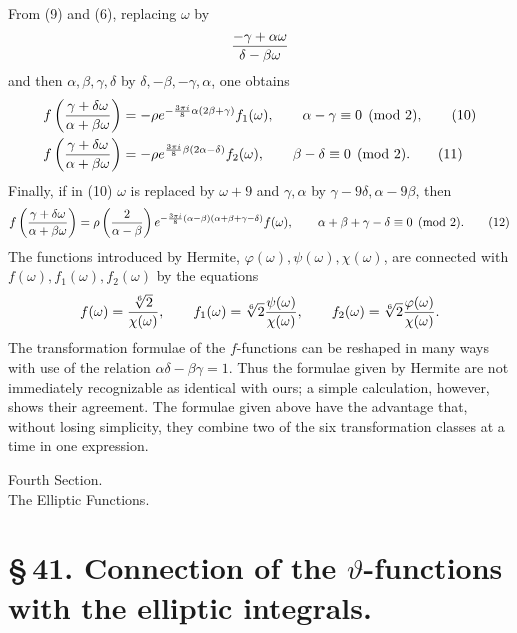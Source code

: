 \documentclass[11pt]{article}
\providecommand{\Jac}[2]{\left(\frac{#1}{#2}\right)}
\begin{document}
From (9) and (6), replacing $\omega$ by
\[
{-\gamma+
\alpha\omega\over\delta-
\beta\omega}
\]
and then $\alpha,\beta,\gamma,\delta$ by $\delta,-\beta,-\gamma,\alpha$, one obtains
\begin{align}
f\left({\gamma+
\delta\omega\over\alpha+
\beta\omega}\right)
&=-\rho e^{-\frac{3\pi i}{8}\alpha(2\beta+
\gamma)}f_1(\omega),
\qquad \alpha-
\gamma\equiv0\pmod2, \tag{10}\\
f\left({\gamma+
\delta\omega\over\alpha+
\beta\omega}\right)
&=-\rho e^{\frac{3\pi i}{8}\beta(2\alpha-
\delta)}f_2(\omega),
\qquad \beta-
\delta\equiv0\pmod2. \tag{11}
\end{align}
Finally, if in (10) $\omega$ is replaced by $\omega+9$ and $\gamma,
\alpha$ by $\gamma-9\delta,
\alpha-9\beta$, then
\begin{equation}
f\left({\gamma+
\delta\omega\over\alpha+
\beta\omega}\right)
=\rho\Jac{2}{\alpha-
\beta}e^{-\frac{3\pi i}{8}(\alpha-
\beta)(\alpha+
\beta+
\gamma-
\delta)}f(\omega),
\qquad \alpha+
\beta+
\gamma-
\delta\equiv0\pmod2. 
\tag{12}
\end{equation}
The functions introduced by Hermite, $\varphi(\omega),\psi(\omega),\chi(\omega)$, are connected with $f(\omega),f_1(\omega),f_2(\omega)$ by the equations
\[
f(\omega)={\sqrt[6]{2}\over\chi(\omega)},
\qquad
f_1(\omega)=\sqrt[6]{2}{\psi(\omega)\over\chi(\omega)},
\qquad
f_2(\omega)=\sqrt[6]{2}{\varphi(\omega)\over\chi(\omega)}.
\]
The transformation formulae of the $f$-functions can be reshaped in many ways with use of the relation $\alpha\delta-\beta\gamma=1$. Thus the formulae given by Hermite are not immediately recognizable as identical with ours; a simple calculation, however, shows their agreement. The formulae given above have the advantage that, without losing simplicity, they combine two of the six transformation classes at a time in one expression.

\begin{center}
{\large Fourth Section.}\\[0.7em]
{\Large The Elliptic Functions.}
\end{center}

\section*{\S\,41. Connection of the $\vartheta$-functions with the elliptic integrals.}
\end{document}
